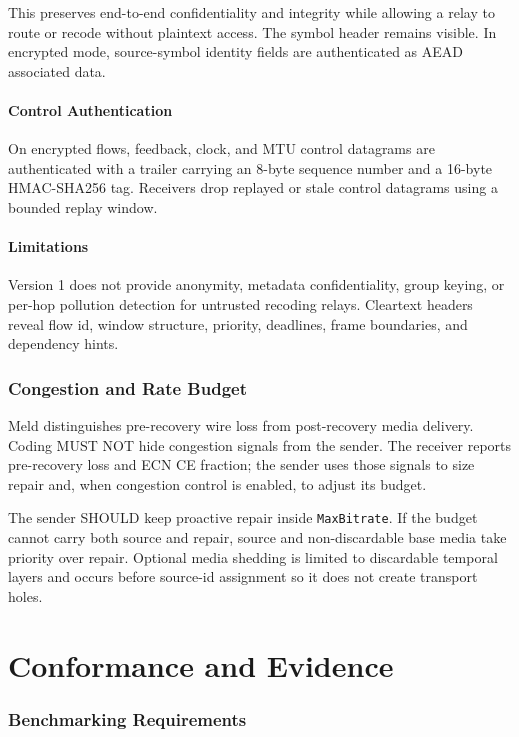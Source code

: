 \documentclass[11pt]{article}
\newcommand{\meld}{Meld}
\newcommand{\wireversion}{1}
\newcommand{\code}[1]{\ifmmode\text{\texttt{#1}}\else\texttt{#1}\fi}
\newcommand{\field}[1]{\code{#1}}
\begin{document}
This preserves end-to-end confidentiality and integrity while allowing a relay to
route or recode without plaintext access. The symbol header remains visible. In
encrypted mode, source-symbol identity fields are authenticated as AEAD associated
data.

\subsection{Control Authentication}

On encrypted flows, feedback, clock, and MTU control datagrams are authenticated
with a trailer carrying an 8-byte sequence number and a 16-byte HMAC-SHA256 tag.
Receivers drop replayed or stale control datagrams using a bounded replay window.

\subsection{Limitations}

Version \wireversion{} does not provide anonymity, metadata confidentiality,
group keying, or per-hop pollution detection for untrusted recoding relays.
Cleartext headers reveal flow id, window structure, priority, deadlines, frame
boundaries, and dependency hints.

\section{Congestion and Rate Budget}

\meld{} distinguishes pre-recovery wire loss from post-recovery media delivery.
Coding MUST NOT hide congestion signals from the sender. The receiver reports
pre-recovery loss and ECN CE fraction; the sender uses those signals to size
repair and, when congestion control is enabled, to adjust its budget.

The sender SHOULD keep proactive repair inside \field{MaxBitrate}. If the budget
cannot carry both source and repair, source and non-discardable base media take
priority over repair. Optional media shedding is limited to discardable temporal
layers and occurs before source-id assignment so it does not create transport
holes.

\clearpage
\part{Conformance and Evidence}

\section{Benchmarking Requirements}
\end{document}
